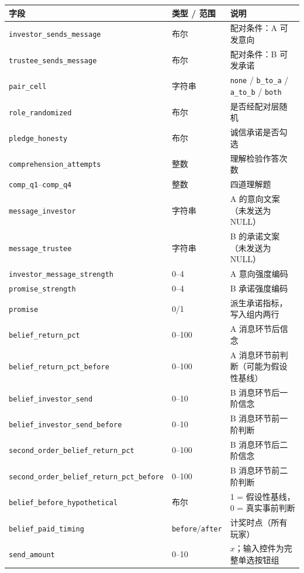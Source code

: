 \documentclass[10pt,a4paper]{ctexart}
\newcommand{\code}[1]{\texttt{#1}}
\begin{document}
\begin{longtable}{p{5.4cm}p{2.9cm}p{5.5cm}}
\toprule
字段 & 类型 / 范围 & 说明 \\
\midrule
\endhead
\code{investor\_sends\_message} & 布尔 & 配对条件：A 可发意向 \\
\code{trustee\_sends\_message} & 布尔 & 配对条件：B 可发承诺 \\
\code{pair\_cell} & 字符串 & \code{none} / \code{b\_to\_a} / \code{a\_to\_b} / \code{both} \\
\code{role\_randomized} & 布尔 & 是否经配对层随机 \\
\code{pledge\_honesty} & 布尔 & 诚信承诺是否勾选 \\
\code{comprehension\_attempts} & 整数 & 理解检验作答次数 \\
\code{comp\_q1}--\code{comp\_q4} & 整数 & 四道理解题 \\
\code{message\_investor} & 字符串 & A 的意向文案（未发送为 NULL） \\
\code{message\_trustee} & 字符串 & B 的承诺文案（未发送为 NULL） \\
\code{investor\_message\_strength} & 0--4 & A 意向强度编码 \\
\code{promise\_strength} & 0--4 & B 承诺强度编码 \\
\code{promise} & 0/1 & 派生承诺指标，写入组内两行 \\
\code{belief\_return\_pct} & 0--100 & A 消息环节后信念 \\
\code{belief\_return\_pct\_before} & 0--100 & A 消息环节前判断（可能为假设性基线） \\
\code{belief\_investor\_send} & 0--10 & B 消息环节后一阶信念 \\
\code{belief\_investor\_send\_before} & 0--10 & B 消息环节前一阶判断 \\
\code{second\_\allowbreak order\_\allowbreak belief\_\allowbreak return\_\allowbreak pct} & 0--100 & B 消息环节后二阶信念 \\
\code{second\_\allowbreak order\_\allowbreak belief\_\allowbreak return\_\allowbreak pct\_\allowbreak before} & 0--100 & B 消息环节前二阶判断 \\
\code{belief\_before\_hypothetical} & 布尔 & 1 = 假设性基线，0 = 真实事前判断 \\
\code{belief\_paid\_timing} & \code{before}/\code{after} & 计奖时点（所有玩家） \\
\code{send\_amount} & 0--10 & $x$；输入控件为完整单选按钮组 \\

\end{longtable}
\end{document}
